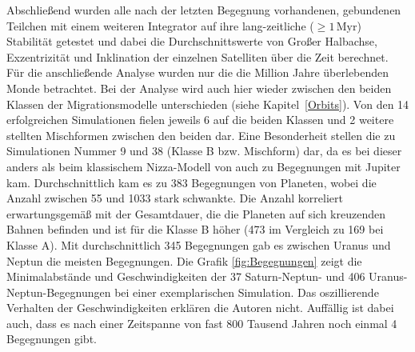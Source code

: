 \documentclass[12pt,a4paper,twoside]{article}
\newcommand{\refsec}[1]{siehe Kapitel~\ref{#1}}
\begin{document}
Abschließend wurden alle nach der letzten Begegnung vorhandenen, gebundenen Teilchen mit einem weiteren Integrator %
auf ihre lang-zeitliche ($\geq 1 \,\mathrm{Myr}$) Stabilität getestet %
und dabei die Durchschnittswerte von Großer Halbachse, Exzentrizität und Inklination der einzelnen Satelliten über die Zeit berechnet.
Für die anschließende Analyse wurden nur die die Million Jahre überlebenden Monde betrachtet\cite{Nesvorny2007}. %
Bei der Analyse wird auch hier wieder zwischen den beiden Klassen der Migrationsmodelle unterschieden (\refsec{Orbits}).
Von den 14 erfolgreichen Simulationen fielen jeweils 6 auf die beiden Klassen und 2 weitere stellten Mischformen zwischen den beiden dar. Eine Besonderheit stellen die zu Simulationen Nummer 9 und 38 (Klasse B bzw. Mischform) dar, da es bei dieser anders als beim klassischem Nizza-Modell von \cite{Tsiganis2005} auch zu Begegnungen mit Jupiter kam.
Durchschnittlich kam es zu 383 Begegnungen von Planeten, wobei die Anzahl zwischen 55 und 1033 stark schwankte.
Die Anzahl korreliert erwartungsgemäß mit der Gesamtdauer, die die Planeten auf sich kreuzenden Bahnen befinden und ist für die Klasse B höher (473 im Vergleich zu 169 bei Klasse A).
Mit durchschnittlich 345 Begegnungen gab es zwischen Uranus und Neptun die meisten Begegnungen\cite{Nesvorny2007}. %
Die Grafik \ref{fig:Begegnungen} zeigt die Minimalabstände und Geschwindigkeiten der 37 Saturn-Neptun- und 406 Uranus-Neptun-Begegnungen bei einer exemplarischen Simulation.
Das oszillierende Verhalten der Geschwindigkeiten erklären die Autoren nicht.
Auffällig ist dabei auch, dass es nach einer Zeitspanne von fast 800 Tausend Jahren noch einmal 4 Begegnungen gibt\cite{Nesvorny2007}.
\end{document}
